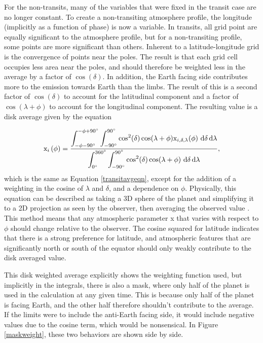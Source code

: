 For the non-transits, many of the variables that were fixed in the transit case are
 no longer constant. To create a non-transiting atmosphere profile, the longitude
 (implicitly as a function of phase) is now a variable. In transits, all grid
 point are equally significant to the atmosphere profile, but for a non-transiting
 profile, some points are more significant than others. Inherent to a
 latitude-longitude grid is the convergence of
 points near the poles. The result is that each grid cell occupies less area
 near the poles, and should therefore be weighted less in the average by a
 factor of $\cos(\delta)$. In addition, the Earth facing side contributes more
 to the emission towards Earth than the limbs. The result of this is a second
 factor of $\cos(\delta)$ to account for the latitudinal component and a factor
 of $\cos(\lambda+\phi)$ to account for the longitudinal component. The
 resulting value is a disk average given by the equation

\begin{equation}
    \mathrm{x}_i\left(\phi\right)=
    \ddfrac{
        \int_{-\phi-\SI{90}{\degree}}^{-\phi+\SI{90}{\degree}}
        \int_{\SI{-90}{\degree}}^{\SI{90}{\degree}}
        \cos^2(\delta)\cos(\lambda+\phi)\mathrm{x}_{i,\delta,\lambda}(\phi)
        \,\dif \delta\dif \lambda
    }
        {\int_{\SI{0}{\degree}}^{\SI{360}{\degree}}
        \int_{\SI{-90}{\degree}}^{\SI{90}{\degree}}
        \cos^2(\delta)\cos(\lambda+\phi)
        \,\dif \delta\dif \lambda
    },
\end{equation}
which is the same as Equation \ref{transitavgeqn}, except for the addition of a
 weighting in the cosine of $\lambda$ and $\delta$, and a dependence on $\phi$.
 Physically, this equation can be described as taking a 3D sphere of the planet
 and simplifying it to a 2D projection as seen by the observer, then averaging
 the observed value \citep{cowanagol08, kollabbot15}. This method means that any
 atmospheric parameter x that varies with respect to $\phi$ should change
 relative to the observer. The cosine squared for latitude indicates that there
 is a strong preference for latitude, and atmospheric features that are
 significantly north or south of the equator should only weakly contribute to
 the disk averaged value.

This disk weighted average explicitly shows the weighting function used, but
implicitly in the integrals, there is also a mask, where only half of the planet
is used in the calculation at any given time. This is because only half of the
planet is facing Earth, and the other half therefore shouldn't contribute to the
average. If the limits were to include the anti-Earth facing side, it would
include negative values due to the cosine term, which would be nonsensical. In
Figure \ref{maskweight}, these two behaviors are shown side by side.

